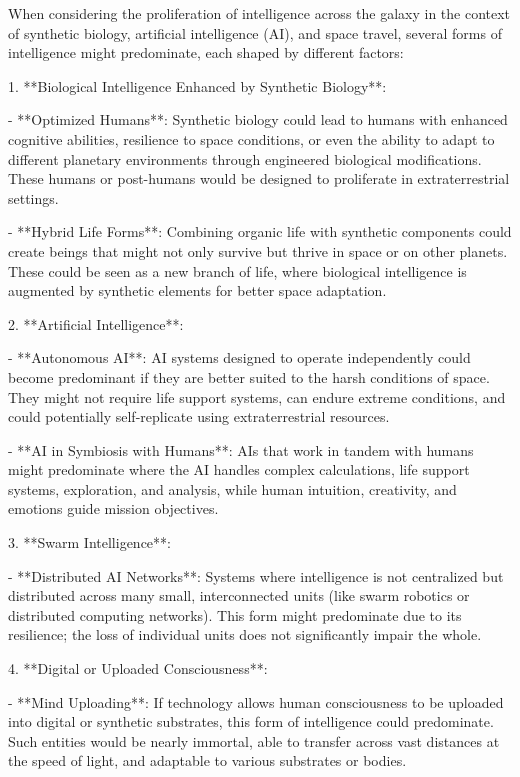 \documentclass[12pt,titlepage]{book}
\begin{document}
When considering the proliferation of intelligence across the galaxy in the context of synthetic biology, artificial intelligence (AI), and space travel, several forms of intelligence might predominate, each shaped by different factors:

1. **Biological Intelligence Enhanced by Synthetic Biology**: 

   - **Optimized Humans**: Synthetic biology could lead to humans with enhanced cognitive abilities, resilience to space conditions, or even the ability to adapt to different planetary environments through engineered biological modifications. These humans or post-humans would be designed to proliferate in extraterrestrial settings.

   - **Hybrid Life Forms**: Combining organic life with synthetic components could create beings that might not only survive but thrive in space or on other planets. These could be seen as a new branch of life, where biological intelligence is augmented by synthetic elements for better space adaptation.

2. **Artificial Intelligence**:

   - **Autonomous AI**: AI systems designed to operate independently could become predominant if they are better suited to the harsh conditions of space. They might not require life support systems, can endure extreme conditions, and could potentially self-replicate using extraterrestrial resources.

   - **AI in Symbiosis with Humans**: AIs that work in tandem with humans might predominate where the AI handles complex calculations, life support systems, exploration, and analysis, while human intuition, creativity, and emotions guide mission objectives.

3. **Swarm Intelligence**:

   - **Distributed AI Networks**: Systems where intelligence is not centralized but distributed across many small, interconnected units (like swarm robotics or distributed computing networks). This form might predominate due to its resilience; the loss of individual units does not significantly impair the whole.

4. **Digital or Uploaded Consciousness**:

   - **Mind Uploading**: If technology allows human consciousness to be uploaded into digital or synthetic substrates, this form of intelligence could predominate. Such entities would be nearly immortal, able to transfer across vast distances at the speed of light, and adaptable to various substrates or bodies.
\end{document}
